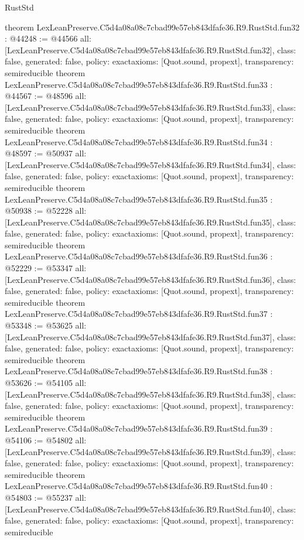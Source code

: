 \begin{lexlean}{RustStd}
\begin{coremodule}
{}
theorem LexLeanPreserve.C5d4a08a08c7cbad99e57eb843dfafe36.R9.RustStd.fun32 : @44248 := @44566 {
  all: [LexLeanPreserve.C5d4a08a08c7cbad99e57eb843dfafe36.R9.RustStd.fun32],
  class: false,
  generated: false,
  policy: exact{axioms: [Quot.sound, propext]},
  transparency: semireducible
}
theorem LexLeanPreserve.C5d4a08a08c7cbad99e57eb843dfafe36.R9.RustStd.fun33 : @44567 := @48596 {
  all: [LexLeanPreserve.C5d4a08a08c7cbad99e57eb843dfafe36.R9.RustStd.fun33],
  class: false,
  generated: false,
  policy: exact{axioms: [Quot.sound, propext]},
  transparency: semireducible
}
theorem LexLeanPreserve.C5d4a08a08c7cbad99e57eb843dfafe36.R9.RustStd.fun34 : @48597 := @50937 {
  all: [LexLeanPreserve.C5d4a08a08c7cbad99e57eb843dfafe36.R9.RustStd.fun34],
  class: false,
  generated: false,
  policy: exact{axioms: [Quot.sound, propext]},
  transparency: semireducible
}
theorem LexLeanPreserve.C5d4a08a08c7cbad99e57eb843dfafe36.R9.RustStd.fun35 : @50938 := @52228 {
  all: [LexLeanPreserve.C5d4a08a08c7cbad99e57eb843dfafe36.R9.RustStd.fun35],
  class: false,
  generated: false,
  policy: exact{axioms: [Quot.sound, propext]},
  transparency: semireducible
}
theorem LexLeanPreserve.C5d4a08a08c7cbad99e57eb843dfafe36.R9.RustStd.fun36 : @52229 := @53347 {
  all: [LexLeanPreserve.C5d4a08a08c7cbad99e57eb843dfafe36.R9.RustStd.fun36],
  class: false,
  generated: false,
  policy: exact{axioms: [Quot.sound, propext]},
  transparency: semireducible
}
theorem LexLeanPreserve.C5d4a08a08c7cbad99e57eb843dfafe36.R9.RustStd.fun37 : @53348 := @53625 {
  all: [LexLeanPreserve.C5d4a08a08c7cbad99e57eb843dfafe36.R9.RustStd.fun37],
  class: false,
  generated: false,
  policy: exact{axioms: [Quot.sound, propext]},
  transparency: semireducible
}
theorem LexLeanPreserve.C5d4a08a08c7cbad99e57eb843dfafe36.R9.RustStd.fun38 : @53626 := @54105 {
  all: [LexLeanPreserve.C5d4a08a08c7cbad99e57eb843dfafe36.R9.RustStd.fun38],
  class: false,
  generated: false,
  policy: exact{axioms: [Quot.sound, propext]},
  transparency: semireducible
}
theorem LexLeanPreserve.C5d4a08a08c7cbad99e57eb843dfafe36.R9.RustStd.fun39 : @54106 := @54802 {
  all: [LexLeanPreserve.C5d4a08a08c7cbad99e57eb843dfafe36.R9.RustStd.fun39],
  class: false,
  generated: false,
  policy: exact{axioms: [Quot.sound, propext]},
  transparency: semireducible
}
theorem LexLeanPreserve.C5d4a08a08c7cbad99e57eb843dfafe36.R9.RustStd.fun40 : @54803 := @55237 {
  all: [LexLeanPreserve.C5d4a08a08c7cbad99e57eb843dfafe36.R9.RustStd.fun40],
  class: false,
  generated: false,
  policy: exact{axioms: [Quot.sound, propext]},
  transparency: semireducible
}
\end{coremodule}
\end{lexlean}
